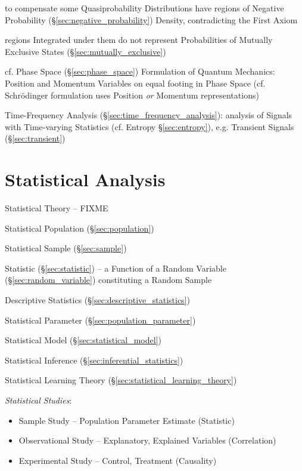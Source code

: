 to compensate some Quasiprobability Distributions have regions of Negative
Probability (\S\ref{sec:negative_probability}) Density, contradicting the First
Axiom

regions Integrated under them do not represent Probabilities of Mutually
Exclusive States (\S\ref{sec:mutually_exclusive})

cf. Phase Space (\S\ref{sec:phase_space}) Formulation of Quantum Mechanics:
Position and Momentum Variables on equal footing in Phase Space (cf.
Schr\"odinger formulation uses Position \emph{or} Momentum representations)

\fist Time-Frequency Analysis (\S\ref{sec:time_frequency_analysis}): analysis
of Signals with Time-varying Statistics (cf. Entropy \S\ref{sec:entropy}), e.g.
Transient Signals (\S\ref{sec:transient})



\section{Statistical Analysis}\label{sec:statistical_analysis}

Statistical Theory -- FIXME

Statistical Population (\S\ref{sec:population})

Statistical Sample (\S\ref{sec:sample})

Statistic (\S\ref{sec:statistic}) -- a Function of a Random Variable
(\S\ref{sec:random_variable}) constituting a Random Sample

Descriptive Statistics (\S\ref{sec:descriptive_statistics})

Statistical Parameter (\S\ref{sec:population_parameter})

Statistical Model (\S\ref{sec:statistical_model})

Statistical Inference (\S\ref{sec:inferential_statistics})

Statistical Learning Theory (\S\ref{sec:statistical_learning_theory})

\emph{Statistical Studies}:
\begin{itemize}
  \item Sample Study -- Population Parameter Estimate (Statistic)
  \item Observational Study -- Explanatory, Explained Variables (Correlation)
  \item Experimental Study -- Control, Treatment (Causality)
\end{itemize}



